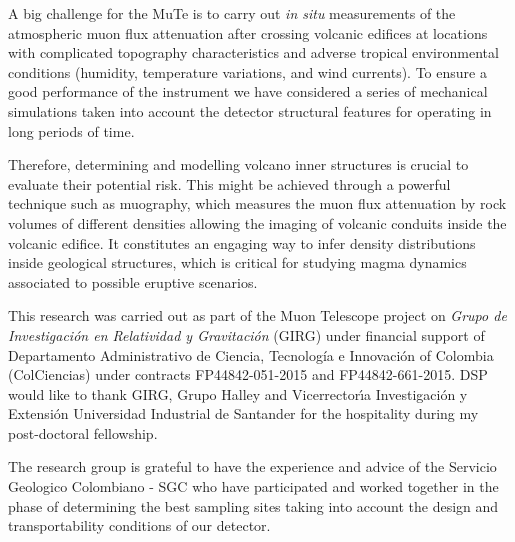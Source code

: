 \documentclass[letterpaper,11pt]{article}
\begin{document}
A big challenge for the MuTe is to carry out {\it in situ} measurements of the atmospheric muon flux attenuation after crossing volcanic edifices at locations with complicated topography characteristics and adverse tropical environmental conditions (humidity, temperature variations, and wind currents). To ensure a good performance of the instrument we have considered a series of mechanical simulations taken into account the detector structural features for operating in long periods of time. 

Therefore, determining and modelling volcano inner structures is crucial to evaluate their potential risk. This might be achieved through a powerful technique such as muography, which measures the muon flux attenuation by rock volumes of different densities allowing the imaging of volcanic conduits inside the volcanic edifice. It constitutes an engaging way to infer density distributions inside geological structures, which is critical for studying magma dynamics associated to possible eruptive scenarios. 

\acknowledgments

This research was carried out as part of the Muon Telescope project on {\it Grupo de Investigaci\'on en Relatividad y Gravitaci\'on} (GIRG) under financial support of  Departamento Administrativo de Ciencia, Tecnolog\'ia e Innovaci\'on of Colombia (ColCiencias) under contracts FP44842-051-2015 and FP44842-661-2015. DSP would like to thank GIRG, Grupo Halley and Vicerrector\'{\i}a Investigaci\'on y Extensi\'on Universidad Industrial de Santander for the hospitality during my post-doctoral fellowship.

The research group is grateful to have the experience and advice of the Servicio Geologico Colombiano - SGC who have participated and worked together in the phase of determining the best sampling sites taking into account the design and transportability conditions of our detector.




\end{document}
